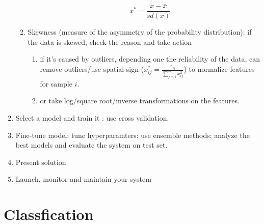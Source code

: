 \documentclass[12pt,oneside,a4paper]{article}
\numberwithin{equation}{section}
\begin{document}
\begin{enumerate}
\begin{enumerate}
\begin{enumerate}
\begin{equation}
x^\ast = \frac{x - \bar{x}}{sd(x)}
\end{equation}
\end{enumerate}
\item Skewness (measure of the asymmetry of the probability distribution): if the data is skewed, check the reason and take action
\begin{enumerate}
\item if it's caused by outliers, depending one the reliability of the data, can remove outliers/use spatial sign ($x_{ij}^\ast = \frac{x_{ij}}{\sum_{j=1}^{m}x_{ij}^2}$) to normalize features for sample $i$.
\item or take log/square root/inverse transformations on the features.
\end{enumerate}
\end{enumerate}
\item Select a model and train it : use cross validation. 
\item Fine-tune model: tune hyperparamters; use ensemble methods; analyze the best models and evaluate the system on test set.  
\item Present solution
\item Launch, monitor and maintain your system 
\end{enumerate} 

\section{Classfication}
\end{document}
